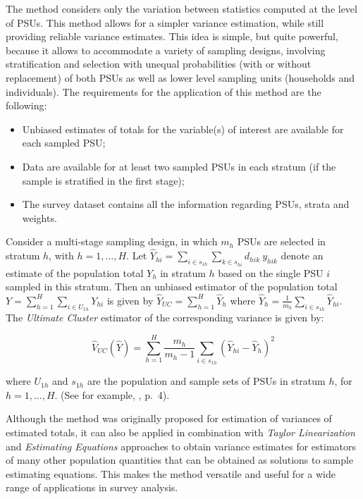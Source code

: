 \documentclass[
  12pt,
]{book}
\begin{document}
The method considers only the variation between statistics computed at the level of PSUs. This method allows for a simpler variance estimation, while still providing reliable variance estimates. This idea is simple, but quite powerful, because it allows to accommodate a variety of sampling designs, involving stratification and selection with unequal probabilities (with or without replacement) of both PSUs as well as lower level sampling units (households and individuals). The requirements for the application of this method are the following:

\begin{itemize}
\item
  Unbiased estimates of totals for the variable(s) of interest are available for each sampled PSU;
\item
  Data are available for at least two sampled PSUs in each stratum (if the sample is stratified in the first stage);
\item
  The survey dataset contains all the information regarding PSUs, strata and weights.
\end{itemize}

Consider a multi-stage sampling design, in which \(m_{h}\) PSUs are selected in stratum \(h\), with \(h=1, \ldots ,H\). Let \(\widehat{Y}_{hi} = \sum_{i \in s_{1h}} \sum_{k \in s_{hi}} d_{hik} \ y_{hik}\) denote an estimate of the population total \(Y_h\) in stratum \(h\) based on the single PSU \(i\) sampled in this stratum. Then an unbiased estimator of the population total \(Y = \sum_{h=1}^{H} \sum_{i \in U_{1h}} Y_{hi}\) is given by \(\widehat{Y}_{UC} = \sum_{h=1}^{H} \widehat{Y}_{h}\) where \(\widehat{Y}_{h} = \frac{1}{m_{h}} \sum_{i \in s_{1h}} \widehat{Y}_{hi}\). The \emph{Ultimate Cluster} estimator of the corresponding variance is given by:

\[
\widehat{V}_{UC} \left( \widehat{Y}\right) = \sum_{h=1}^{H} \frac{m_{h}}
{m_{h}-1} \sum_{i \in s_{1h}} \left( \widehat{Y}_{hi} - \widehat{Y}_{h} \right) ^{2}
\]

where \(U_{1h}\) and \(s_{1h}\) are the population and sample sets of PSUs in stratum \(h\), for \(h=1,\ldots ,H\). (See for example, \citep{Shah1993}, p.~4).

Although the method was originally proposed for estimation of variances of estimated totals, it can also be applied in combination with \emph{Taylor Linearization} and \emph{Estimating Equations} approaches to obtain variance estimates for estimators of many other population quantities that can be obtained as solutions to sample estimating equations. This makes the method versatile and useful for a wide range of applications in survey analysis.
\end{document}
